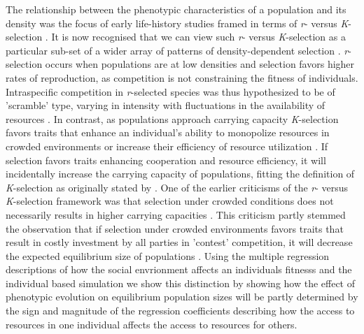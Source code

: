 \documentclass{article}
\begin{document}
The relationship between the phenotypic characteristics of a population and its density was the focus of early life-history studies framed in terms of \textit{r}- versus \textit{K}-selection \citep{macarthur1967theory}. It is now recognised that we can view such \textit{r}- versus \textit{K}-selection as a particular sub-set of a wider array of patterns of density-dependent selection \citep{Boyce1984, Wright2018, Engen2020}. \textit{r}-selection occurs when populations are at low densities and selection favors higher rates of reproduction, as competition is not constraining the fitness of individuals. Intraspecific competition in \textit{r}-selected species was thus hypothesized to be of 'scramble' type, varying in intensity with fluctuations in the availability of resources \citep{Southwood1977}. In contrast, as populations approach carrying capacity \textit{K}-selection favors traits that enhance an individual's ability to monopolize resources in crowded environments or increase their efficiency of resource utilization \citep{Boyce1984}. If selection favors traits enhancing cooperation and resource efficiency, it will incidentally increase the carrying capacity of populations, fitting the definition of \textit{K}-selection as originally stated by \cite{macarthur1967theory}. One of the earlier criticisms of the \textit{r}- versus \textit{K}-selection framework was that selection under crowded conditions does not necessarily results in higher carrying capacities \citep{Boyce1984}. This criticism partly stemmed the observation that if selection under crowded environments favors traits that result in costly investment by all parties in 'contest' competition, it will decrease the expected equilibrium size of populations \citep{Joshi2001, Engen2020}. Using the multiple regression descriptions of how the social envrionment affects an individuals fitnesss and the individual based simulation we show this distinction by showing how the effect of phenotypic evolution on equilibrium population sizes will be partly determined by the sign and magnitude of the regression coefficients describing how the access to resources in one individual affects the access to resources for others.
\end{document}
